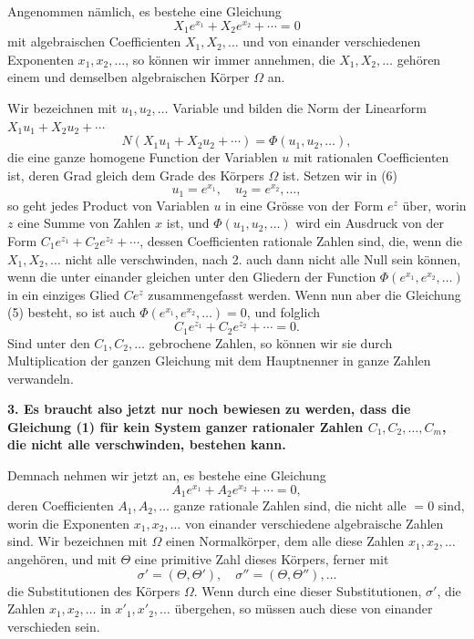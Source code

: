 \documentclass[11pt]{article}
\begin{document}
Angenommen nämlich, es bestehe eine Gleichung
\begin{equation}\tag{5}
X_1e^{x_1}+X_2e^{x_2}+\cdots=0
\end{equation}
mit algebraischen Coefficienten $X_1,X_2,\ldots$ und von einander verschiedenen Exponenten $x_1,x_2,\ldots$, so können wir immer annehmen, die $X_1,X_2,\ldots$ gehören einem und demselben algebraischen Körper $\Omega$ an.

Wir bezeichnen mit $u_1,u_2,\ldots$ Variable und bilden die Norm der Linearform $X_1u_1+X_2u_2+\cdots$
\begin{equation}\tag{6}
N(X_1u_1+X_2u_2+\cdots)=\Phi(u_1,u_2,\ldots),
\end{equation}
die eine ganze homogene Function der Variablen $u$ mit rationalen Coefficienten ist, deren Grad gleich dem Grade des Körpers $\Omega$ ist. Setzen wir in (6)
\[
u_1=e^{x_1},\quad u_2=e^{x_2},\ldots,
\]
so geht jedes Product von Variablen $u$ in eine Grösse von der Form $e^z$ über, worin $z$ eine Summe von Zahlen $x$ ist, und $\Phi(u_1,u_2,\ldots)$ wird ein Ausdruck von der Form $C_1e^{z_1}+C_2e^{z_2}+\cdots$, dessen Coefficienten rationale Zahlen sind, die, wenn die $X_1,X_2,\ldots$ nicht alle verschwinden, nach 2. auch dann nicht alle Null sein können, wenn die unter einander gleichen unter den Gliedern der Function $\Phi(e^{x_1},e^{x_2},\ldots)$ in ein einziges Glied $Ce^z$ zusammengefasst werden. Wenn nun aber die Gleichung (5) besteht, so ist auch $\Phi(e^{x_1},e^{x_2},\ldots)=0$, und folglich
\[
C_1e^{z_1}+C_2e^{z_2}+\cdots=0.
\]
Sind unter den $C_1,C_2,\ldots$ gebrochene Zahlen, so können wir sie durch Multiplication der ganzen Gleichung mit dem Hauptnenner in ganze Zahlen verwandeln.

\textbf{3. Es braucht also jetzt nur noch bewiesen zu werden, dass die Gleichung (1) für kein System ganzer rationaler Zahlen $C_1,C_2,\ldots,C_m$, die nicht alle verschwinden, bestehen kann.}

Demnach nehmen wir jetzt an, es bestehe eine Gleichung
\begin{equation}\tag{7}
A_1e^{x_1}+A_2e^{x_2}+\cdots=0,
\end{equation}
deren Coefficienten $A_1,A_2,\ldots$ ganze rationale Zahlen sind,
die nicht alle $=0$ sind, worin die Exponenten $x_1,x_2,\ldots$ von einander verschiedene algebraische Zahlen sind. Wir bezeichnen mit $\Omega$ einen Normalkörper, dem alle diese Zahlen $x_1,x_2,\ldots$ angehören, und mit $\Theta$ eine primitive Zahl dieses Körpers, ferner mit
\[
\sigma'=(\Theta,\Theta'),\quad \sigma''=(\Theta,\Theta''),\ldots
\]
die Substitutionen des Körpers $\Omega$. Wenn durch eine dieser Substitutionen, $\sigma'$, die Zahlen $x_1,x_2,\ldots$ in $x'_1,x'_2,\ldots$ übergehen, so müssen auch diese von einander verschieden sein.
\end{document}
